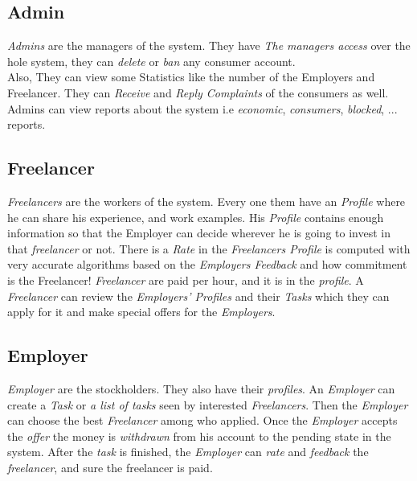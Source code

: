 \documentclass{article}
\begin{document}
\subsection{Admin}
\hspace{0.5cm} \textit{Admins} are the managers of the system. They have
\textit{The managers access} over the hole system, they can \textit{delete}
or \textit{ban} any consumer account. \\
Also, They can view some Statistics like the number of the Employers and
Freelancer. They can \textit{Receive} and \textit{Reply Complaints} of the
consumers as well. \\Admins can view reports about the system
 i.e \textit{economic}, \textit{consumers}, \textit{blocked}, ...   reports.

\subsection{Freelancer}
\hspace{0.5cm} \textit{Freelancers} are the workers of the system.
Every one them have an \textit{Profile} where he can share his experience,
and work examples. His \textit{Profile} contains enough information
so that the Employer can decide wherever he is going to invest in that
\textit{freelancer} or not.
There is a \textit{Rate} in the \textit{Freelancers Profile} is computed
with very accurate algorithms based on the \textit{Employers Feedback}
and how commitment is the Freelancer!
\textit{Freelancer} are paid per hour, and it is in the \textit{profile}.
A \textit{Freelancer} can review the \textit{Employers' Profiles} and
their \textit{Tasks} which they can apply for it and make special offers
for the \textit{Employers}.


\subsection{Employer}
\hspace{0.5cm} \textit{Employer} are the stockholders. They also have
their \textit{profiles}. An \textit{Employer} can create a \textit{Task} or
\textit{a list of tasks} seen  by interested \textit{Freelancers}.
Then the \textit{Employer} can choose the best \textit{Freelancer} among who
applied. Once the \textit{Employer} accepts the \textit{offer}
the money is \textit{withdrawn} from his account to the pending state in
the system. After the \textit{task} is finished, the \textit{Employer} can
\textit{rate} and \textit{feedback} the \textit{freelancer},
and sure the freelancer is paid.
\end{document}
